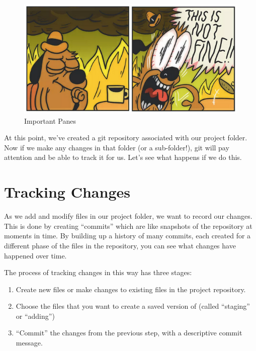 \documentclass[]{Nemilov}
\providecommand{\tightlist}{%
  \setlength{\itemsep}{0pt}\setlength{\parskip}{0pt}}
\begin{document}
\begin{figure}
\centering
\includegraphics{figures/FIXME.png}
\caption{\label{fig:py-version-control-important-panes}Important Panes}
\end{figure}

At this point, we've created a git repository associated with our project
folder. Now if we make any changes in that folder (or a sub-folder!), git
will pay attention and be able to track it for us. Let's see what happens
if we do this.

\hypertarget{py-version-control-tracking-changes}{%
\section{Tracking Changes}\label{py-version-control-tracking-changes}}

As we add and modify files in our project folder, we want to record our changes.
This is done by creating ``commits'' which are like snapshots of the repository at
moments in time. By building up a history of many commits, each created for a
different phase of the files in the repository, you can see what changes have happened over time.

The process of tracking changes in this way has three stages:

\begin{enumerate}
\def\labelenumi{\arabic{enumi}.}
\tightlist
\item
  Create new files or make changes to existing files in the project repository.
\item
  Choose the files that you want to create a saved version of (called ``staging'' or ``adding'')
\item
  ``Commit'' the changes from the previous step, with a descriptive commit message.
\end{enumerate}
\end{document}
